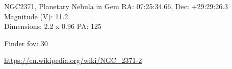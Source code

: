 \begin{block}{NGC2371, Planetary Nebula in Gem}
    RA: 07:25:34.66, Dec: +29:29:26.3 \\ 
    Magnitude (V): 11.2 \\ 
    Dimensions: 2.2 x 0.96 PA: 125 

    Finder fov: 30 

    \url{https://en.wikipedia.org/wiki/NGC_2371-2} 
\end{block}